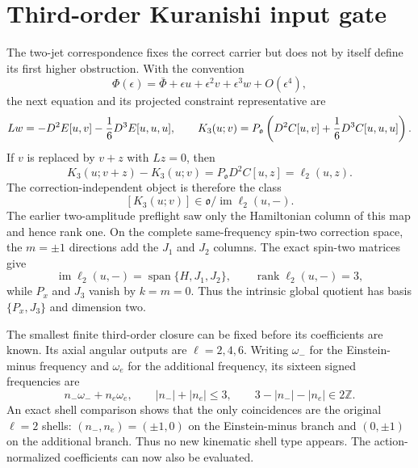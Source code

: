 \documentclass[11pt]{article}
\theoremstyle{definition}
\theoremstyle{remark}
\begin{document}
\section{Third-order Kuranishi input gate}

The two-jet correspondence fixes the correct carrier but does not by itself
define its first higher obstruction.  With the convention
\[
 \Phi(\epsilon)=\bar\Phi+\epsilon u+\epsilon^2v+\epsilon^3w
 +O(\epsilon^4),
\]
the next equation and its projected constraint representative are
\[
 Lw=-D^2E[u,v]-{1\over6}D^3E[u,u,u],
 \qquad
 K_3(u;v)=P_{\mathfrak o}\left(
 D^2C[u,v]+{1\over6}D^3C[u,u,u]\right).
\]
If $v$ is replaced by $v+z$ with $Lz=0$, then
\[
 K_3(u;v+z)-K_3(u;v)=P_{\mathfrak o}D^2C[u,z]
 =\ell_2(u,z).
\]
The correction-independent object is therefore the class
\[
 [K_3(u;v)]\in
 \mathfrak o/\operatorname{im}\ell_2(u,-).
\]
The earlier two-amplitude preflight saw only the Hamiltonian column of this
map and hence rank one.  On the complete same-frequency spin-two correction
space, the $m=\pm1$ directions add the $J_1$ and $J_2$ columns.  The exact
spin-two matrices give
\[
 \operatorname{im}\ell_2(u,-)=\operatorname{span}\{H,J_1,J_2\},
 \qquad \operatorname{rank}\ell_2(u,-)=3,
\]
while $P_x$ and $J_3$ vanish by $k=m=0$.  Thus the intrinsic global quotient
has basis $\{P_x,J_3\}$ and dimension two.

The smallest finite third-order closure can be fixed before its coefficients
are known.  Its axial angular outputs are $\ell=2,4,6$.  Writing
$\omega_-$ for the Einstein-minus frequency and $\omega_e$ for the additional
frequency, its sixteen signed frequencies are
\[
 n_-\omega_-+n_e\omega_e,
 \qquad
 |n_-|+|n_e|\leq3,
 \qquad
 3-|n_-|-|n_e|\in2\mathbb Z.
\]
An exact shell comparison shows that the only coincidences are the original
$\ell=2$ shells: $(n_-,n_e)=(\pm1,0)$ on the Einstein-minus branch and
$(0,\pm1)$ on the additional branch.  Thus no new kinematic shell type
appears.  The action-normalized coefficients can now also be evaluated.
\end{document}
